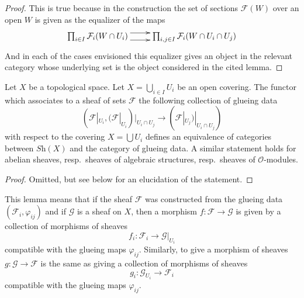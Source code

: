 \begin{proof}
This is true because in the construction the set of sections
$\mathcal{F}(W)$ over an open $W$ is given as the 
equalizer of the maps
$$
\xymatrix{
\prod_{i \in I} \mathcal{F}_i(W \cap U_i)
\ar@<1ex>[r]
\ar@<-1ex>[r]
&
\prod_{i,j\in I} \mathcal{F}_i(W \cap U_i \cap U_j)
}
$$
And in each of the cases envisioned this equalizer gives
an object in the relevant category whose underlying set is
the object considered in the cited lemma.
\end{proof}

\begin{lemma}
\label{lemma-mapping-property-glue}
Let $X$ be a topological space.
Let $X = \bigcup_{i\in I} U_i$ be an open covering.
The functor which associates to a sheaf of
sets $\mathcal{F}$ the following collection of
glueing data
$$
(\mathcal{F}|_{U_i},
(\mathcal{F}|_{U_i})|_{U_i \cap U_j}
\to
(\mathcal{F}|_{U_j})|_{U_i \cap U_j}
)
$$
with respect to the covering $X = \bigcup U_i$
defines an equivalence of categories between 
$\textit{Sh}(X)$ and the category of glueing
data. A similar statement holds for
abelian sheaves, resp.\ sheaves of algebraic structures,
resp.\ sheaves of $\mathcal{O}$-modules.
\end{lemma}

\begin{proof}
Omitted, but see below for an elucidation of the statement.
\end{proof}

\noindent
This lemma means that if the sheaf $\mathcal{F}$ was constructed
from the glueing data $(\mathcal{F}_i, \varphi_{ij})$
and if $\mathcal{G}$ is a sheaf on $X$, then a morphism
$f : \mathcal{F} \to \mathcal{G}$ is given by a collection of
morphisms of sheaves
$$
f_i : \mathcal{F}_i \longrightarrow \mathcal{G}|_{U_i}
$$
compatible with the glueing maps $\varphi_{ij}$. Similarly,
to give a morphism of sheaves $g : \mathcal{G} \to \mathcal{F}$
is the same as giving a collection of morphisms of sheaves
$$
g_i : \mathcal{G}_{U_i} \longrightarrow \mathcal{F}_i
$$
compatible with the glueing maps $\varphi_{ij}$.










